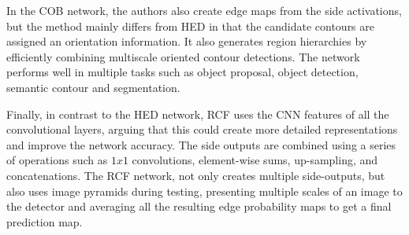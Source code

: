 In the COB network, the authors also create edge maps from the side activations, but the method mainly differs from HED in that the candidate contours are assigned an orientation information. It also generates region hierarchies by efficiently combining multiscale oriented contour detections. The network performs well in multiple tasks such as object proposal, object detection, semantic contour and segmentation.


Finally, in contrast to the HED network, RCF uses the CNN features of all the convolutional layers, arguing that this could create more detailed representations and improve the network accuracy. The side outputs are combined using a series of operations such as $1x1$ convolutions, element-wise sums, up-sampling, and concatenations. The RCF network, not only creates multiple side-outputs, but also uses image pyramids during testing, presenting multiple scales of an image to the detector and  averaging all the resulting edge probability maps to get a final prediction map. 


